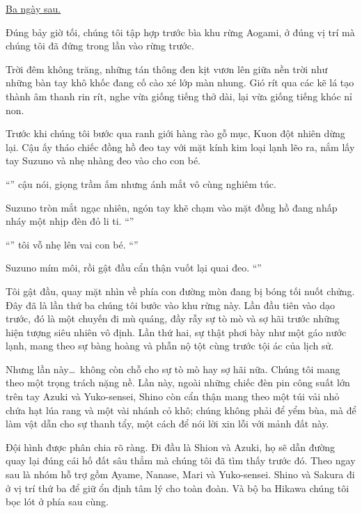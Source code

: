\documentclass[../main.tex]{subfiles}
\begin{document}
\begin{center}
  \uline{Ba ngày sau.}
\end{center}

Đúng bảy giờ tối, chúng tôi tập hợp trước bìa khu rừng Aogami, ở đúng vị trí mà chúng tôi đã đứng trong lần vào rừng trước.

Trời đêm không trăng, những tán thông đen kịt vươn lên giữa nền trời như những bàn tay khô khốc đang cố cào xé lớp màn nhung. Gió rít qua các kẽ lá tạo thành âm thanh rin rít, nghe vừa giống tiếng thở dài, lại vừa giống tiếng khóc nỉ non.

Trước khi chúng tôi bước qua ranh giới hàng rào gỗ mục, Kuon đột nhiên dừng lại. Cậu ấy tháo chiếc đồng hồ đeo tay với mặt kính kim loại lạnh lẽo ra, nắm lấy tay Suzuno và nhẹ nhàng đeo vào cho con bé.

``'' cậu nói, giọng trầm ấm nhưng ánh mắt vô cùng nghiêm túc.

Suzuno tròn mắt ngạc nhiên, ngón tay khẽ chạm vào mặt đồng hồ đang nhấp nháy một nhịp đèn đỏ li ti. ``''

``'' tôi vỗ nhẹ lên vai con bé. ``''

Suzuno mím môi, rồi gật đầu cẩn thận vuốt lại quai đeo. ``''

Tôi gật đầu, quay mặt nhìn về phía con đường mòn đang bị bóng tối nuốt chửng. Đây đã là lần thứ ba chúng tôi bước vào khu rừng này. Lần đầu tiên vào dạo trước, đó là một chuyến đi mù quáng, đầy rẫy sự tò mò và sợ hãi trước những hiện tượng siêu nhiên vô định. Lần thứ hai, sự thật phơi bày như một gáo nước lạnh, mang theo sự bàng hoàng và phẫn nộ tột cùng trước tội ác của lịch sử.

Nhưng lần này\dots\ không còn chỗ cho sự tò mò hay sợ hãi nữa. Chúng tôi mang theo một trọng trách nặng nề. Lần này, ngoài những chiếc đèn pin công suất lớn trên tay Azuki và Yuko-sensei, Shino còn cẩn thận mang theo một túi vải nhỏ chứa hạt lúa rang và một vài nhánh cỏ khô; chúng không phải để yểm bùa, mà để làm vật dẫn cho sự thanh tẩy, một cách để nói lời xin lỗi với mảnh đất này.

Đội hình được phân chia rõ ràng. Đi đầu là Shion và Azuki, họ sẽ dẫn đường quay lại đúng cái hố đất sâu thẳm mà chúng tôi đã tìm thấy trước đó. Theo ngay sau là nhóm hỗ trợ gồm Ayame, Nanase, Mari và Yuko-sensei. Shino và Sakura đi ở vị trí thứ ba để giữ ổn định tâm lý cho toàn đoàn. Và bộ ba Hikawa chúng tôi bọc lót ở phía sau cùng.
\end{document}
